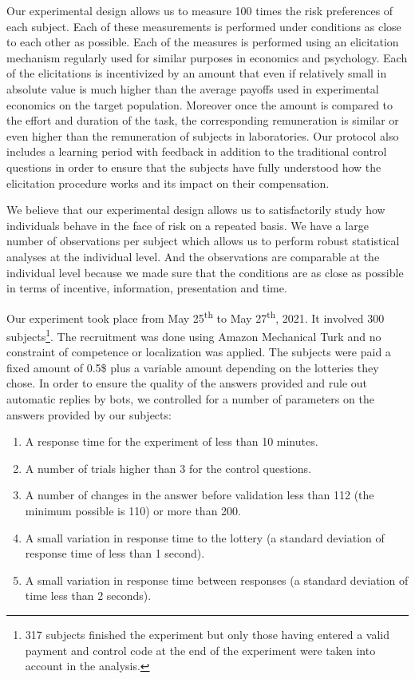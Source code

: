 \documentclass[
]{book}
\providecommand{\tightlist}{%
  \setlength{\itemsep}{0pt}\setlength{\parskip}{0pt}}
\begin{document}
Our experimental design allows us to measure 100 times the risk
preferences of each subject. Each of these measurements is performed
under conditions as close to each other as possible. Each of the
measures is performed using an elicitation mechanism regularly used for
similar purposes in economics and psychology. Each of the elicitations
is incentivized by an amount that even if relatively small in absolute
value is much higher than the average payoffs used in experimental
economics on the target population. Moreover once the amount is compared
to the effort and duration of the task, the corresponding
remuneration is similar or even higher than the remuneration of subjects
in laboratories. Our protocol also includes a learning period with
feedback in addition to the traditional control questions in order to
ensure that the subjects have fully understood how the elicitation
procedure works and its impact on their compensation.

We believe that our experimental design allows us to satisfactorily
study how individuals behave in the face of risk on a repeated basis. We
have a large number of observations per subject which allows us to
perform robust statistical analyses at the individual level. And the
observations are comparable at the individual level because we made sure
that the conditions are as close as possible in terms of incentive,
information, presentation and time.

Our experiment took place from May 25\textsuperscript{th} to May 27\textsuperscript{th}, 2021.
It involved 300 subjects\footnote{317 subjects finished the experiment but only those
  having entered a valid payment and control code at the end of the experiment were taken into
  account in the analysis.}.
The recruitment was done using Amazon Mechanical Turk and no
constraint of competence or localization was applied.
The subjects were
paid a fixed amount of 0.5\$ plus a variable amount depending on the
lotteries they chose.
In order to ensure the quality of the answers provided
and rule out automatic replies by bots,
we controlled for a number of parameters on the answers provided by
our subjects:

\begin{enumerate}
\def\labelenumi{\arabic{enumi}.}
\tightlist
\item
  A response time for the experiment of less than 10 minutes.
\item
  A number of trials higher than 3 for the control questions.
\item
  A number of changes in the answer before validation less than 112
  (the minimum possible is 110) or more than 200.
\item
  A small variation in response time to the lottery (a standard
  deviation of response time of less than 1 second).
\item
  A small variation in response time between responses (a standard
  deviation of time less than 2 seconds).
\end{enumerate}
\end{document}
